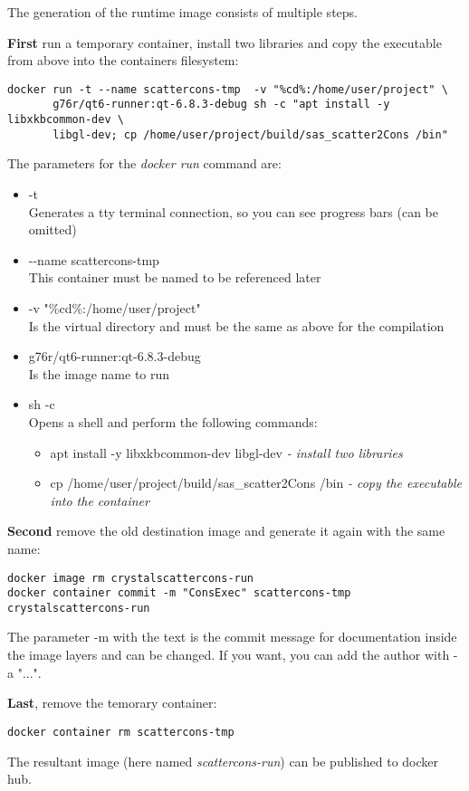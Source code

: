 \documentclass[11pt]{article} %
\begin{document}
The generation of the runtime image consists of multiple steps.

{\bf First} run a temporary container, install two libraries and copy the executable from above into the containers filesystem:
\begin{lstlisting}[frame=single]
docker run -t --name scattercons-tmp  -v "%cd%:/home/user/project" \
       g76r/qt6-runner:qt-6.8.3-debug sh -c "apt install -y libxkbcommon-dev \
       libgl-dev; cp /home/user/project/build/sas_scatter2Cons /bin"
\end{lstlisting}
The parameters for the {\it docker run} command are:
\begin{itemize}\itemsep0pt
\item -t \\
	Generates a tty terminal connection, so you can see progress bars (can be omitted)
\item -{}-name scattercons-tmp \\
	This container must be named to be referenced later
\item -v "\%cd\%:/home/user/project" \\
	Is the virtual directory and must be the same as above for the compilation
\item g76r/qt6-runner:qt-6.8.3-debug \\
	Is the image name to run
\item sh -c \\
	Opens a shell and perform the following commands:
	\begin{itemize}[*]\itemsep0pt
	\item apt install -y libxkbcommon-dev libgl-dev {\it - install two libraries}
	\item cp /home/user/project/build/sas\_scatter2Cons /bin {\it - copy the executable into the container}
	\end{itemize}
\end{itemize}

{\bf Second} remove the old destination image and generate it again with the same name:
\begin{lstlisting}[frame=single]
docker image rm crystalscattercons-run
docker container commit -m "ConsExec" scattercons-tmp crystalscattercons-run
\end{lstlisting}
The parameter -m with the text is the commit message for documentation inside the image layers and can be changed. If you want, you can add the author with -a "...".

{\bf Last}, remove the temorary container:
\begin{lstlisting}[frame=single]
docker container rm scattercons-tmp
\end{lstlisting}
The resultant image (here named {\it scattercons-run}) can be published to docker hub.
\end{document}
